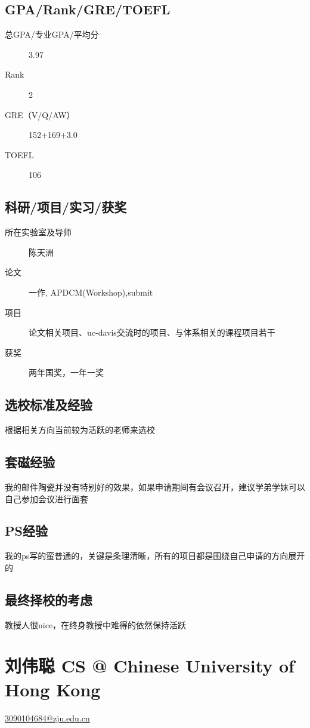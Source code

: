 \documentclass[11pt,fleqn,openany]{book} %
\begin{document}
\subsection*{GPA/Rank/GRE/TOEFL}
\begin{description}
\item[总GPA/专业GPA/平均分] 3.97
\item[Rank] 2
\item[GRE（V/Q/AW）] 152+169+3.0
\item[TOEFL] 106
\end{description}

\subsection*{科研/项目/实习/获奖}
\begin{description}
\item[所在实验室及导师] 陈天洲
\item[论文] 一作, APDCM(Workshop),submit
\item[项目] 论文相关项目、uc-davis交流时的项目、与体系相关的课程项目若干
\item[获奖] 两年国奖，一年一奖
\end{description}
\subsection*{选校标准及经验}
根据相关方向当前较为活跃的老师来选校
\subsection*{套磁经验}
我的邮件陶瓷并没有特别好的效果，如果申请期间有会议召开，建议学弟学妹可以自己参加会议进行面套
\subsection*{PS经验}
我的ps写的蛮普通的，关键是条理清晰，所有的项目都是围绕自己申请的方向展开的
\subsection*{最终择校的考虑}
教授人很nice，在终身教授中难得的依然保持活跃
\clearpage
\section{刘伟聪 CS @ Chinese University of Hong Kong}
\hfill \href{mailto:3090104684@zju.edu.cn}{3090104684@zju.edu.cn}
\end{document}
